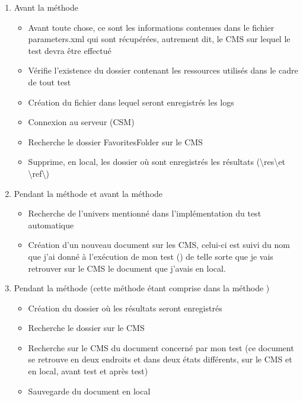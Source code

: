 \begin{enumerate}
	\item Avant la m\'{e}thode 
	\begin{itemize}
		\item Avant toute chose, ce sont les informations contenues dans le fichier parameters.xml qui sont r\'{e}cup\'{e}r\'{e}es, autrement dit, le \gls{CMS} sur lequel le test devra \^{e}tre effectu\'{e}
		\item V\'{e}rifie l'existence du dossier contenant les ressources utilis\'{e}s dans le cadre de tout test
		\item Cr\'{e}ation du fichier dans lequel seront enregistr\'{e}s les logs 
		\item Connexion au serveur (CSM)
		\item Recherche le dossier FavoritesFolder sur le \gls{CMS}
		\item Supprime, en local, les dossier o\`{u} sont enregistr\'{e}s les r\'{e}sultats (\textbackslash res\textbackslash  et \textbackslash ref\textbackslash )
		
	\end{itemize}
	\item Pendant la m\'{e}thode  et avant la m\'{e}thode 
	\begin{itemize}
		\item Recherche de l'univers mentionn\'{e} dans l'impl\'{e}mentation du test automatique
		\item Cr\'{e}ation d'un nouveau document sur les \gls{CMS}, celui-ci est suivi du nom que j'ai donn\'{e} \`{a} l'ex\'{e}cution de mon test () de telle sorte que je vais retrouver sur le \gls{CMS} le document que j'avais en local.
	\end{itemize}
	\item Pendant la m\'{e}thode  (cette m\'{e}thode \'{e}tant comprise dans la m\'{e}thode )
	\begin{itemize}
		\item Cr\'{e}ation du dossier o\`{u} les r\'{e}sultats seront enregistr\'{e}s
		\item Recherche le dossier  sur le \gls{CMS}
		\item Recherche sur le \gls{CMS} du document concern\'{e} par mon test (ce document se retrouve en deux endroits et dans deux \'{e}tats diff\'{e}rents, sur le \gls{CMS} et en local, avant test et apr\`{e}s test)
		\item Sauvegarde du document en local
		

\end{itemize}
\end{enumerate}
